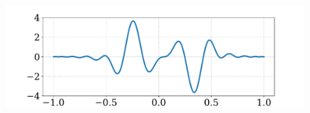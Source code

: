 \documentclass[9pt,usepdftitle=false,aspectratio=169]{beamer}
\newcommand{\backupend}{ %
  \setcounter{framenumber}{\value{finalframe}}
}
\begin{document}
\begin{frame}
\begin{columns}
\begin{column}{0.5\textwidth}
\begin{center}
        \includegraphics[width=0.85\textwidth]{jump_expon}\\
      \end{center}
    \end{column}
  \end{columns}
\end{frame}

\backupend
\end{document}
